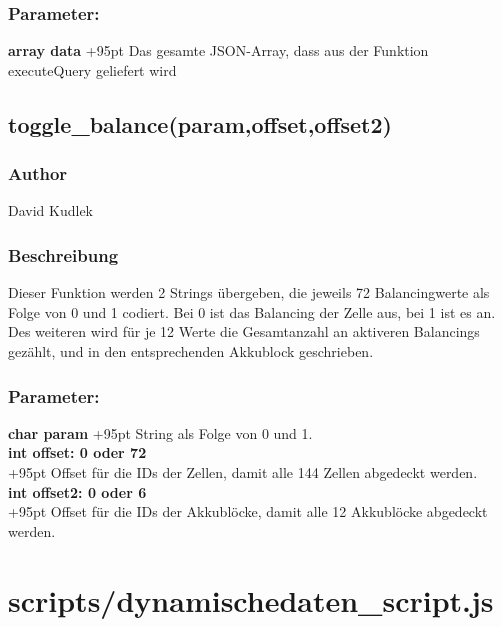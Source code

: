 \documentclass[fontsize = 12pt, paper = a4]{scrreprt}
\begin{document}
\subsubsection*{Parameter:}
\textbf{array data } 
\hspace{7mm}
\hangindent+95pt 
Das gesamte JSON-Array, dass aus der Funktion executeQuery geliefert wird \\


\subsection*{toggle\_balance(param,offset,offset2)}
\subsubsection*{Author}
David Kudlek
\subsubsection*{Beschreibung}
Dieser Funktion werden 2 Strings übergeben, die jeweils 72 Balancingwerte als Folge von 0 und 1 codiert. Bei 0 ist das Balancing der Zelle aus, bei 1 ist es an. Des weiteren wird für je 12 Werte die Gesamtanzahl an aktiveren Balancings gezählt, und in den entsprechenden Akkublock geschrieben. 
\subsubsection*{Parameter:}
\textbf{char param  } 
\hspace{7mm}
\hangindent+95pt 
String als Folge von 0 und 1. \\

\textbf{int offset: 0 oder 72}\\ 
\hangindent+95pt 
Offset für die IDs der Zellen, damit alle 144 Zellen abgedeckt werden. \\

\textbf{int offset2: 0 oder 6} \\
\hangindent+95pt 
Offset für die IDs der Akkublöcke, damit alle 12 Akkublöcke abgedeckt werden. \\





\section{scripts/dynamischedaten\_script.js}
\end{document}
